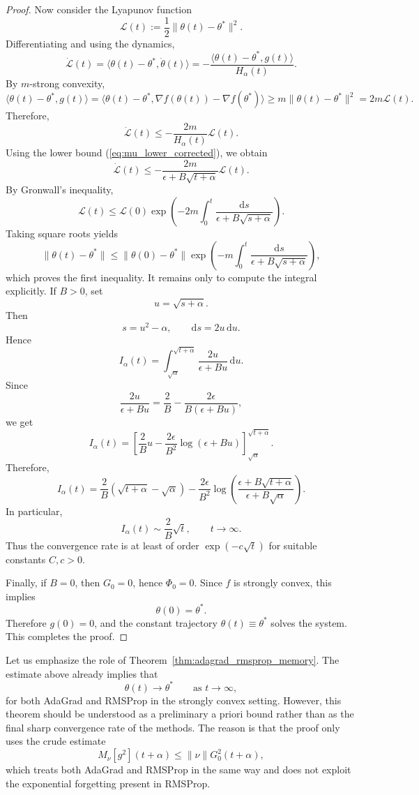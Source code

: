 \documentclass{article} %
\begin{document}
\begin{proof}
Now consider the Lyapunov function
\begin{equation}\label{th1:liapunov}
 \mathcal L(t)
:=
\frac12\|\theta(t)-\theta^*\|^2.   
\end{equation}
Differentiating and using the dynamics,
\[
\dot{\mathcal L}(t)
=
\langle \theta(t)-\theta^*,\dot\theta(t)\rangle
=
-
\frac{
\langle \theta(t)-\theta^*,g(t)\rangle
}
{H_\alpha(t)}.
\]
By \(m\)-strong convexity,
\[
\langle \theta(t)-\theta^*,g(t)\rangle
=
\langle \theta(t)-\theta^*,
\nabla f(\theta(t))-\nabla f(\theta^*)\rangle
\ge
m\|\theta(t)-\theta^*\|^2
=
2m\mathcal L(t).
\]
Therefore,
\[
\dot{\mathcal L}(t)
\le
-
\frac{2m}{H_\alpha(t)}
\mathcal L(t).
\]
Using the lower bound (\ref{eq:mu_lower_corrected}), we obtain
\[
\dot{\mathcal L}(t)
\le
-
\frac{2m}{\epsilon+B\sqrt{t+\alpha}}
\mathcal L(t).
\]
By Gronwall's inequality,
\[
\mathcal L(t)
\le
\mathcal L(0)
\exp\!\left(
-2m
\int_0^t
\frac{\mathrm ds}
{\epsilon+B\sqrt{s+\alpha}}
\right).
\]
Taking square roots yields
\[
\|\theta(t)-\theta^*\|
\le
\|\theta(0)-\theta^*\|
\exp\!\left(
-m
\int_0^t
\frac{\mathrm ds}
{\epsilon+B\sqrt{s+\alpha}}
\right),
\]
which proves the first inequality. It remains only to compute the integral explicitly. If \(B>0\), set
\[
u=\sqrt{s+\alpha}.
\]
Then
\[
s=u^2-\alpha,
\qquad
\mathrm ds=2u\,\mathrm du.
\]
Hence
\[
I_\alpha(t)
=
\int_{\sqrt{\alpha}}^{\sqrt{t+\alpha}}
\frac{2u}{\epsilon+Bu}\,\mathrm du.
\]
Since
\[
\frac{2u}{\epsilon+Bu}
=
\frac{2}{B}
-
\frac{2\epsilon}{B(\epsilon+Bu)},
\]
we get
\[
I_\alpha(t)
=
\left[
\frac{2}{B}u
-
\frac{2\epsilon}{B^2}\log(\epsilon+Bu)
\right]_{\sqrt{\alpha}}^{\sqrt{t+\alpha}}.
\]
Therefore,
\[
I_\alpha(t)
=
\frac{2}{B}
\left(
\sqrt{t+\alpha}-\sqrt{\alpha}
\right)
-
\frac{2\epsilon}{B^2}
\log\!\left(
\frac{\epsilon+B\sqrt{t+\alpha}}
{\epsilon+B\sqrt{\alpha}}
\right).
\]
In particular,
\[
I_\alpha(t)
\sim
\frac{2}{B}\sqrt t,
\qquad t\to\infty.
\]
Thus the convergence rate is at least of order \(\exp(-c\sqrt t)\) for suitable constants \(C,c>0\).

Finally, if \(B=0\), then \(G_0=0\), hence \(\Phi_0=0\). Since \(f\) is strongly convex, this implies
\[
\theta(0)=\theta^*.
\]
Therefore \(g(0)=0\), and the constant trajectory \(\theta(t)\equiv \theta^*\) solves the system. This completes the proof.
\end{proof}

Let us emphasize the role of Theorem~\ref{thm:adagrad_rmsprop_memory}. The estimate above already implies that
\[
\theta(t)\to\theta^*
\qquad\text{as }t\to\infty,
\]
for both AdaGrad and RMSProp in the strongly convex setting. However, this theorem should be understood as a preliminary a priori bound rather than as the final sharp convergence rate of the
methods. The reason is that the proof only uses the crude estimate
\[
M_\nu[g^2](t+\alpha)
\le
\|\nu\|G_0^2(t+\alpha),
\]
which treats both AdaGrad and RMSProp in the same way and does not exploit the exponential forgetting present in RMSProp.
\end{document}
